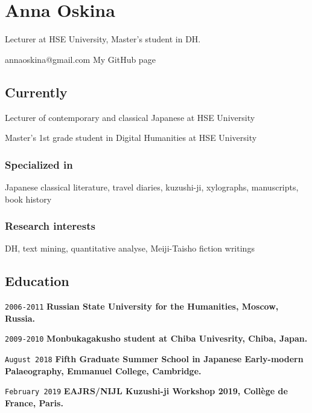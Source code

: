 \documentclass[]{article}
\title{}
\author{}
\date{}
\begin{document}
\hypertarget{anna-oskina}{%
\section{Anna Oskina}\label{anna-oskina}}

Lecturer at HSE University, Master's student in DH.

\leavevmode\hypertarget{webaddress}{}%
annaoskina@gmail.com \textbar{} My GitHub page

\hypertarget{currently}{%
\subsection{Currently}\label{currently}}

Lecturer of contemporary and classical Japanese at HSE University

Master's 1st grade student in Digital Humanities at HSE University

\hypertarget{specialized-in}{%
\subsubsection{Specialized in}\label{specialized-in}}

Japanese classical literature, travel diaries, kuzushi-ji, xylographs,
manuscripts, book history

\hypertarget{research-interests}{%
\subsubsection{Research interests}\label{research-interests}}

DH, text mining, quantitative analyse, Meiji-Taisho fiction writings

\hypertarget{education}{%
\subsection{Education}\label{education}}

\texttt{2006-2011} \textbf{Russian State University for the Humanities,
Moscow, Russia.}

\texttt{2009-2010} \textbf{Monbukagakusho student at Chiba Univesrity,
Chiba, Japan.}

\texttt{August\ 2018} \textbf{Fifth Graduate Summer School in Japanese
Early-modern Palaeography, Emmanuel College, Cambridge.}

\texttt{February\ 2019} \textbf{EAJRS/NIJL Kuzushi-ji Workshop 2019,
Collège de France, Paris.}
\end{document}
